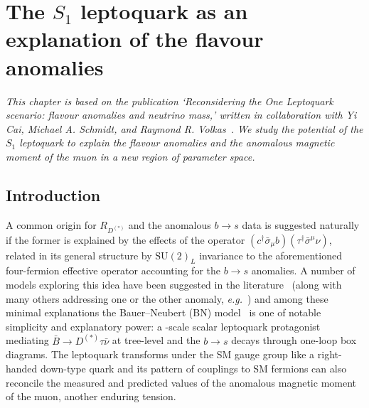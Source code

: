 \graphicspath{{img/chapter_3/}}


\chapter{The $S_{1}$ leptoquark as an explanation of the flavour anomalies}
\label{chapter:the-one-lq}

\begin{flushleft}
  \textit{This chapter is based on the publication `Reconsidering the One
    Leptoquark scenario: flavour anomalies and neutrino mass,' written in
    collaboration with Yi Cai, Michael A. Schmidt, and Raymond R.
    Volkas~\cite{Cai:2017wry}. We study the potential of the $S_{1}$ leptoquark
    to explain the flavour anomalies and the anomalous magnetic moment of the
    muon in a new region of parameter space.}
\end{flushleft}

\section{Introduction}

A common origin for $R_{D^{(*)}}$ and the anomalous $b\rightarrow s$ data is
suggested naturally if the former is explained by the effects of the operator
$(c^{\dagger} \bar{\sigma}_\mu b)(\tau^{\dagger} \bar{\sigma}^\mu \nu)$, related in its
general structure by $\mathrm{SU}(2)_L$ invariance to the aforementioned
four-fermion effective operator accounting for the $b \rightarrow s$ anomalies.
A number of models exploring this idea have been suggested in the
literature~\cite{Alonso:2015sja, Bauer:2015knc, Becirevic:2016oho,
  Becirevic:2016yqi, Boucenna:2016wpr, Boucenna:2016qad, Calibbi:2015kma,
  Crivellin:2017zlb, Deppisch:2016qqd, Deshpand:2016cpw, Fajfer:2015ycq,
  Feruglio:2016gvd, Feruglio:2017rjo, Megias:2017ove, Popov:2016fzr} (along
with many others addressing one or the other anomaly,
\textit{e.g.}~\cite{Becirevic:2015asa, Becirevic:2017jtw, Buras:2013qja,
  Freytsis:2015qca, Gauld:2013qba, Glashow:2014iga, Gripaios:2014tna,
  Hiller:2014ula, Hiller:2014yaa, Mahmoudi:2014mja, Megias:2016bde, Pas:2015hca,
  Sahoo:2015fla, Sahoo:2015qha, Sakaki:2013bfa, Sierra:2015fma,
  Varzielas:2015iva, deBoer:2015boa}) and among these minimal explanations the
Bauer--Neubert (BN) model~\cite{Bauer:2015knc} is one of notable simplicity and
explanatory power: a \TeV-scale scalar leptoquark protagonist mediating
$\bar{B}\rightarrow D^{(*)}\tau \bar{\nu}$ at tree-level and the
$b \rightarrow s$ decays through one-loop box diagrams. The leptoquark
transforms under the SM gauge group like a right-handed down-type quark and its
pattern of couplings to SM fermions can also reconcile the measured and
predicted values of the anomalous magnetic moment of the muon, another enduring
tension.

